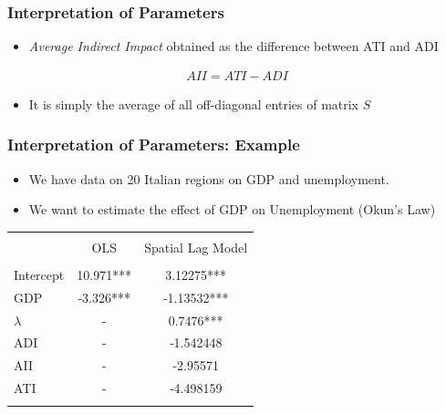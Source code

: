 \documentclass[
  shownotes,
  xcolor={svgnames},
  hyperref={colorlinks,citecolor=DarkBlue,linkcolor=DarkRed,urlcolor=DarkBlue}
  , aspectratio=169]{beamer}
\begin{document}
\begin{frame}
\frametitle{Interpretation of Parameters}

\begin{itemize}
\item {\it Average Indirect Impact} obtained as the difference between ATI and ADI
\end{itemize}

\begin{align}
AII = ATI - ADI
\end{align}

\bigskip

\begin{itemize}
\item It is simply the average of all off-diagonal entries of matrix $S$
\end{itemize}


\end{frame}
\begin{frame}
\frametitle{Interpretation of Parameters: Example}
\begin{itemize}
  \item We have data on 20 Italian regions on GDP and unemployment. 
  \item We want to estimate the effect of GDP on Unemployment (Okun's Law)
\end{itemize}


\begin{table}[H]
\begin{tabular}{lcc} \\
[-1.8ex] \hline \hline \\[-1.8ex]
          & OLS       & Spatial Lag Model \\
 \hline \\[-1.8ex]          
Intercept & 10.971*** & 3.12275***        \\
GDP       & ‐3.326*** & ‐1.13532***       \\
$\lambda$ & -         & 0.7476***         \\
ADI       & -         & ‐1.542448         \\
AII       & -         & -2.95571           \\
ATI       & -         & ‐4.498159        \\
\hline \hline \\[-1.8ex]
\end{tabular}
\end{table}

\end{frame}
\end{document}
